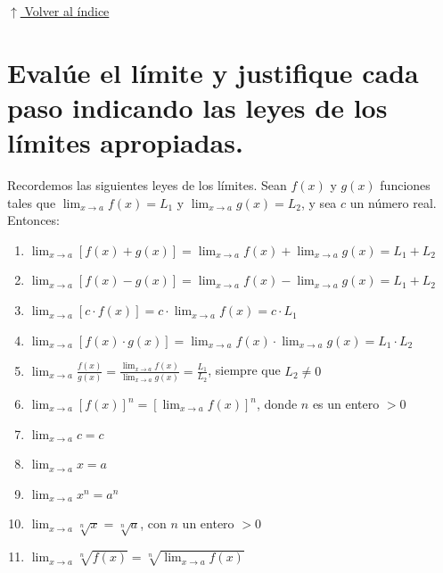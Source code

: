 \documentclass[12pt]{article}
\newcommand{\volverindice}{%
    \vspace{1em}%
    \begin{flushright}%
        \hyperlink{indice}{\small $\uparrow$ Volver al índice}%
    \end{flushright}%
}
\begin{document}
\volverindice
\newpage

\section[Evaluación de límites]{Evalúe el límite y justifique cada paso indicando las leyes de los límites apropiadas.}

Recordemos las siguientes leyes de los límites. Sean $f(x)$ y $g(x)$ funciones tales que $\lim_{x\to a} f(x) = L_1$ y $\lim_{x\to a} g(x) = L_2$, y sea $c$ un número real. Entonces:

\begin{enumerate}[label=\arabic*.-]
    \item $\displaystyle\lim_{x\to a}[f(x)+g(x)] = \lim_{x\to a}f(x) + \lim_{x\to a}g(x) = L_1 + L_2$
    \item $\displaystyle\lim_{x\to a}[f(x)-g(x)] = \lim_{x\to a}f(x) - \lim_{x\to a}g(x) = L_1 + L_2$
    \item $\displaystyle\lim_{x\to a}[c\cdot f(x)] = c\cdot\lim_{x\to a}f(x) = c\cdot L_1$
    \item $\displaystyle\lim_{x\to a}[f(x)\cdot g(x)] = \lim_{x\to a}f(x)\cdot\lim_{x\to a}g(x) = L_1\cdot L_2$
    \item $\displaystyle\lim_{x\to a}\frac{f(x)}{g(x)} = \frac{\lim_{x\to a}f(x)}{\lim_{x\to a}g(x)} = \frac{L_1}{L_2}$, siempre que $L_2 \neq 0$
    \item $\displaystyle\lim_{x\to a}[f(x)]^n = \left[\lim_{x\to a}f(x)\right]^n$, donde $n$ es un entero $>0$
    \item $\displaystyle\lim_{x\to a} c = c$
    \item $\displaystyle\lim_{x\to a} x = a$
    \item $\displaystyle\lim_{x\to a} x^n = a^n$
    \item $\displaystyle\lim_{x\to a} \sqrt[n]{x} = \sqrt[n]{a}$, con $n$ un entero $>0$
    \item $\displaystyle\lim_{x\to a} \sqrt[n]{f(x)} = \sqrt[n]{\lim_{x\to a}f(x)}$
\end{enumerate}
\end{document}
